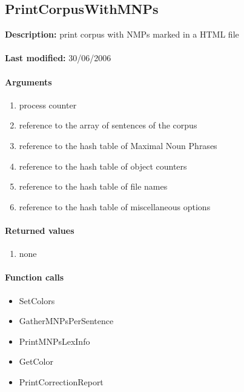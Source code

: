 \subsection{PrintCorpusWithMNPs}
\textbf{Description:} print corpus with NMPs marked in a HTML file\\
\\\textbf{Last modified:} 30/06/2006

\paragraph{Arguments}
\begin{enumerate}
\item process counter
\item reference to the array of sentences of the corpus
\item reference to the hash table of Maximal Noun Phrases
\item reference to the hash table of object counters
\item reference to the hash table of file names
\item reference to the hash table of miscellaneous options
\end{enumerate}

\paragraph{Returned values}
\begin{enumerate}
\item none
\end{enumerate}

\paragraph{Function calls}
\begin{itemize}
\item SetColors
\item GatherMNPsPerSentence
\item PrintMNPsLexInfo
\item GetColor
\item PrintCorrectionReport
\end{itemize}

